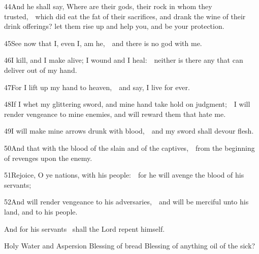 44\enspace And he shall say, Where are their gods, their rock in whom they trusted,\ \star\ which did eat the fat of their sacrifices, and drank the wine of their drink offerings? let them rise up and help you, and be your protection.

45\enspace See now that I, even I, am he,\ \star\ and there is no god with me.

46\enspace I kill, and I make alive; I wound and I heal:\ \star\ neither is there any that can deliver out of my hand.

47\enspace For I lift up my hand to heaven,\ \star\ and say, I live for ever.

48\enspace If I whet my glittering sword, and mine hand take hold on judgment;\ \star\ I will render vengeance to mine enemies, and will reward them that hate me.

49\enspace I will make mine arrows drunk with blood,\ \star\ and my sword shall devour flesh.

50\enspace And that with the blood of the slain and of the captives,\ \star\ from the beginning of revenges upon the enemy.

51\enspace Rejoice, O ye nations, with his people:\ \star\ for he will avenge the blood of his servants;

52\enspace And will render vengeance to his adversaries,\ \star\ and will be merciful unto his land, and to his people.

 And for his servants \star\ shall the Lord repent himself.

\medskip

\fleuron

\bigskip

Holy Water and Aspersion
Blessing of bread
Blessing of anything
oil of the sick?






